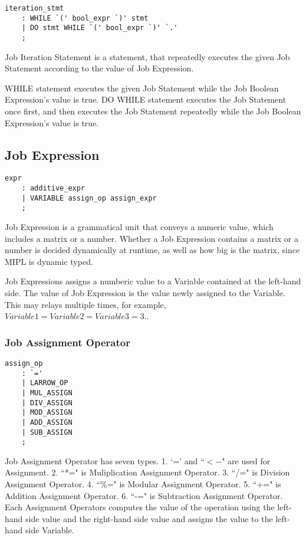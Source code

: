 \documentclass[prodmode,acmtecs]{acmsmall}
\begin{document}
\begin{lstlisting}
iteration_stmt
	: WHILE `(' bool_expr `)' stmt
	| DO stmt WHILE `(' bool_expr `)' `.'
	;
\end{lstlisting}

Job Iteration Statement is a statement, that repeatedly executes
the given Job Statement according to the value of Job Expression.

WHILE statement executes the given Job Statement while the Job
Boolean Expression's value is true.  DO WHILE statement executes the
Job Statement once first, and then executes the Job Statement repeatedly
while the Job Boolean Expression's value is true.
\medskip


\subsection{Job Expression}

\begin{lstlisting}
expr
	: additive_expr
	| VARIABLE assign_op assign_expr
	;
\end{lstlisting}

\label{Expression_Section}
Job Expression is a grammatical unit that conveys a numeric value,
which includes a matrix or a number.  Whether a Job Expression
contains a matrix or a number is decided dynamically at runtime,
as well as how big is the matrix, since MIPL is dynamic typed.

Job Expressions assigns a numberic value to a Variable contained
at the left-hand side.  The value of Job Expression is the value
newly assigned to the Variable.  This may relays multiple times,
for example, $Variable1 = Variable2 = Variable3 = 3.$.
\medskip


\subsubsection{Job Assignment Operator}

\begin{lstlisting}
assign_op
	: `='
	| LARROW_OP
	| MUL_ASSIGN
	| DIV_ASSIGN
	| MOD_ASSIGN
	| ADD_ASSIGN
	| SUB_ASSIGN
	;
\end{lstlisting}

Job Assignment Operator has seven types.  1. `=' and ``$<-$" are used
for Assignment.  2. ``*=" is Muliplication Assignment Operator.  3. 
``/=" is Division Assignment Operator.  4. ``\%=" is Modular Assignment
Operator.  5. ``+=" is Addition Assignment Operator.  6. ``-=" is
Subtraction Assignment Operator.  Each Assignment Operators computes
the value of the operation using the left-hand side value and the
right-hand side value and assigns the value to the left-hand side
Variable.
\medskip
\end{document}
